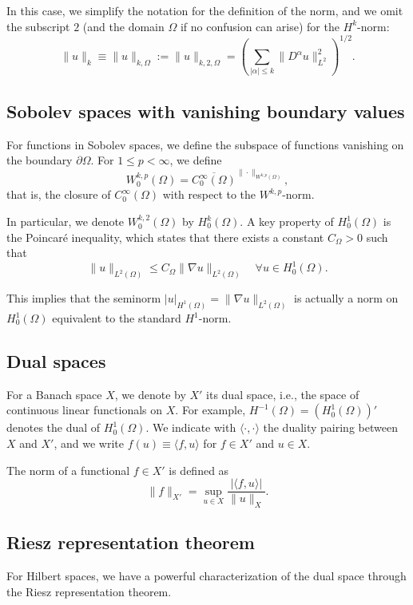 In this case, we simplify the notation for the definition of the norm, and we omit the subscript $2$ (and the domain $\Omega$ if no confusion can arise) for the $H^k$-norm:
\[
  \|u\|_{k} \equiv \|u\|_{k,\Omega} := \|u\|_{k,2,\Omega} = \left( \sum_{|\alpha| \leq k} \|D^\alpha u\|_{L^2}^2 \right)^{1/2}.
\]

\subsection{Sobolev spaces with vanishing boundary values}

For functions in Sobolev spaces, we define the subspace of functions vanishing on the boundary $\partial\Omega$. For $1 \leq p < \infty$, we define
\[
W_0^{k,p}(\Omega) = \overline{C_0^\infty(\Omega)}^{\|\cdot\|_{W^{k,p}(\Omega)}},
\]
that is, the closure of $C_0^\infty(\Omega)$ with respect to the $W^{k,p}$-norm.

In particular, we denote $W_0^{k,2}(\Omega)$ by $H_0^k(\Omega)$. A key property of $H_0^1(\Omega)$ is the Poincaré inequality, which states that there exists a constant $C_{\Omega} > 0$ such that
\[
\|u\|_{L^2(\Omega)} \leq C_{\Omega} \|\nabla u\|_{L^2(\Omega)} \quad \forall u \in H_0^1(\Omega).
\]

This implies that the seminorm $|u|_{H^1(\Omega)} = \|\nabla u\|_{L^2(\Omega)}$ is actually a norm on $H_0^1(\Omega)$ equivalent to the standard $H^1$-norm.

\subsection{Dual spaces}

For a Banach space $X$, we denote by $X'$ its dual space, i.e., the space of continuous linear functionals on $X$. For example, $H^{-1}(\Omega) = (H_0^1(\Omega))'$ denotes the dual of $H_0^1(\Omega)$. We indicate with $\langle \cdot, \cdot \rangle$ the duality pairing between $X$ and $X'$, and we write $f(u) \equiv \langle f, u \rangle$ for $f \in X'$ and $u \in X$.

The norm of a functional $f \in X'$ is defined as
\[
\|f\|_{X'} = \sup_{u \in X} \frac{|\langle f, u \rangle|}{\|u\|_X}.
\]

\subsection{Riesz representation theorem}

For Hilbert spaces, we have a powerful characterization of the dual space through the Riesz representation theorem.

